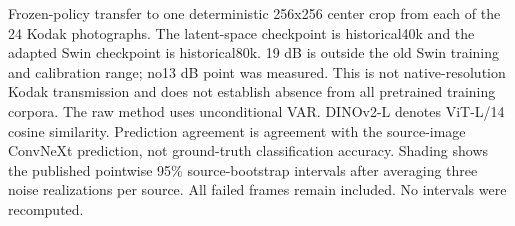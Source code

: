 Frozen-policy transfer to one deterministic 256x256 center crop from each of the 24 Kodak photographs. The latent-space checkpoint is historical40k and the adapted Swin checkpoint is historical80k. 19 dB is outside the old Swin training and calibration range; no13 dB point was measured. This is not native-resolution Kodak transmission and does not establish absence from all pretrained training corpora. The raw method uses unconditional VAR. DINOv2-L denotes ViT-L/14 cosine similarity. Prediction agreement is agreement with the source-image ConvNeXt prediction, not ground-truth classification accuracy. Shading shows the published pointwise 95\% source-bootstrap intervals after averaging three noise realizations per source. All failed frames remain included. No intervals were recomputed.
